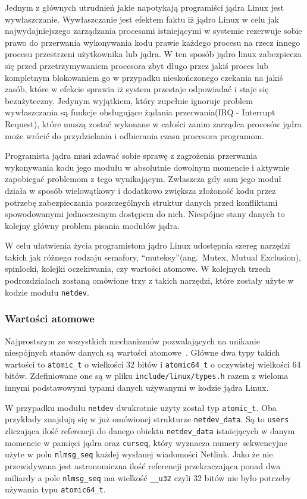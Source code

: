 \documentclass[11pt]{scrartcl}
\begin{document}
Jednym z głównych utrudnień jakie napotykają programiści jądra Linux jest wywłaszczanie. Wywłaszczanie jest efektem faktu iż jądro Linux w celu jak najwydajniejszego zarządzania procesami istniejącymi w systemie rezerwuje sobie prawo do przerwania wykonywania kodu prawie każdego procesu na rzecz innego procesu przestrzeni użytkownika lub jądra. W ten sposób jądro linux zabezpiecza się przed przetrzymywaniem procesora zbyt długo przez jakiś proces lub kompletnym blokowaniem go w przypadku nieskończonego czekania na jakiś zasób, które w efekcie sprawia iż system przestaje odpowiadać i staje się bezużyteczny. Jedynym wyjątkiem, który zupełnie ignoruje problem wywłaszczania są funkcje obsługujące żądania przerwania(IRQ - Interrupt Request), które muszą zostać wykonane w całości zanim zarządca procesów jądra może wrócić do przydzielania i odbierania czasu procesora programom.

Programista jądra musi zdawać sobie sprawę z zagrożenia przerwania wykonywania kodu jego modułu w absolutnie dowolnym momencie i aktywnie zapobiegać problemom z tego wynikającym. Zwłaszcza gdy sam jego moduł działa w sposób wielowątkowy i dodatkowo zwiększa złożoność kodu przez potrzebę zabezpieczania poszczególnych struktur danych przed konfliktami spowodowanymi jednoczesnym dostępem do nich. Niespójne stany danych to kolejny główny problem pisania modułów jądra.

W celu ułatwienia życia programistom jądro Linux udostępnia szereg narzędzi takich jak różnego rodzaju semafory, ``muteksy''(ang.\ Mutex, Mutual Exclusion), spinlocki, kolejki oczekiwania, czy wartości atomowe. W kolejnych trzech podrozdziałach zostaną omówione trzy z takich narzędzi, które zostały użyte w kodzie modułu \texttt{netdev}.

\subsubsection{Wartości atomowe}

Najprostszym ze wszystkich mechanizmów pozwalających na unikanie niespójnych stanów danych są wartości atomowe~\cite{refcount}. Główne dwa typy takich wartości to \texttt{atomic\_t} o wielkości 32 bitów i \texttt{atomic64\_t} o oczywistej wielkości 64 bitów. Zdefiniowane one są w pliku \texttt{include/linux/types.h} razem z wieloma innymi podstawowymi typami danych używanymi w kodzie jądra Linux.

W przypadku modułu \texttt{netdev} dwukrotnie użyty został typ \texttt{atomic\_t}. Oba przykłady znajdują się w już omówionej strukturze \texttt{netdev\_data}. Są to \texttt{users} zliczająca ilość referencji do danego obiektu \texttt{netdev\_data} istniejących w danym momencie w pamięci jądra oraz \texttt{curseq}, który wyznacza numery sekwencyjne użyte w polu \texttt{nlmsg\_seq} każdej wysłanej wiadomości Netlink. Jako że nie przewidywana jest astronomiczna ilość referencji przekraczająca ponad dwa miliardy a pole \texttt{nlmsg\_seq} ma wielkość \texttt{\_\_u32} czyli 32 bitów nie było potrzeby używania typu \texttt{atomic64\_t}.
\end{document}
